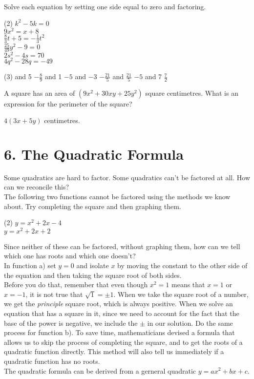\documentclass[12pt,fleqn]{book}
\newcommand{\prb}[1]{\begin{Exercise}#1\end{Exercise}}
\newcommand{\sol}[1]{\begin{Answer}#1\end{Answer}}
\begin{document}
\prb{Solve each equation by setting one side equal to zero and factoring.
	\begin{tasks}(2)
		\task $k^2-5 k=0$
		\\[5em]
		\task $9 x^2=x+8$
		\\[5em]
		\task $\frac{8}{3} t+5=-\frac{1}{3} t^2$
		\\[5em]
		\task $\frac{25}{49} y^2-9=0$
		\\[5em]
		\task $2 s^2-4 s=70$
		\\[5em]
		\task $4 q^2-28 q=-49$
		\\[5em]
	\end{tasks}
}
\sol{
	\begin{tasks}(3)
		 and 5
		\task $-\frac{8}{9}$ and 1
		\task $-5$ and $-3$
		\task $-\frac{21}{5}$ and $\frac{21}{5}$
		\task $-5$ and 7
		\task $\frac{7}{2}$
	\end{tasks}
}
\prb{A square has an area of $\left(9 x^2+30 x y+25 y^2\right)$ square centimetres. What is an expression for the perimeter of the square?\\[5em]}
\sol{$4(3x + 5y)$ centimetres.}






\chapter{6. The Quadratic Formula}
Some quadratics are hard to factor.  Some quadratics can't be factored at all.  How can we reconcile this?
\\[1em]
The following two functions cannot be factored using the methods we know about.  Try completing the square and then graphing them.
\begin{tasks}(2)
	\task $y=x^{2}+2x-4$\\[4em]
	\task $y=x^{2}+2x+2$\\[4em]
\end{tasks}
Since neither of these can be factored, without graphing them, how can we tell which one has roots and which one doesn't?
\\[1em]
In function a) set $y=0$ and isolate $x$ by moving the constant to the other side of the equation and then taking the square root of both sides.
\\[1em]
Before you do that, remember that even though $x^2=1$ means that $x=1$ or $x=-1$, it is not true that $\sqrt 1 = \pm 1$.  When we take the square root of a number, we get the \emph{principle} square root, which is always positive.  When we solve an equation that has a square in it, since we need to account for the fact that the base of the power is negative, we include the $\pm$ in our solution.
\clearpage
Do the same process for function b).
\vspace{3in}
To save time, mathematicians devised a formula that allows us to skip the process of completing the square, and to get the roots of a quadratic function directly.  This method will also tell us immediately if a quadratic function has no roots.
\\[1em]
The quadratic formula can be derived from a gerneral quadratic $y=ax^2+bx+c$.
\clearpage
\end{document}
